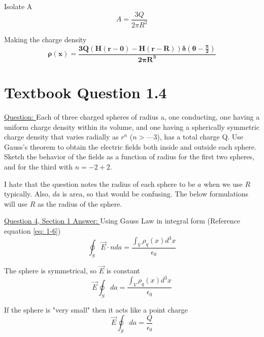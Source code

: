 \documentclass[English]{article}
\begin{document}
    Isolate A
    \begin{equation} \label{eq:3-3}
        A = \frac{3Q}{2 \pi R^3}
    \end{equation}

    Making the charge density 
    \begin{equation} \label{eq:3-4}
        \boxed{\boldsymbol{\rho(x) = \frac{3 Q (H(r-0) - H(r-R)) \delta(\theta - \frac{\pi}{2})}{2 \pi R^3}}}
    \end{equation}

\newpage
\section{Textbook Question 1.4} \label{section4}
    \underline{Question: }
    \newline Each of three charged spheres of radius a, one conducting, one having a uniform charge density within its volume, and one having a spherically symmetric charge density that varies radially as $r^n$ ($n > —3$), has a total charge Q. Use Gauss’s theorem to obtain the electric fields both inside and outside each sphere. Sketch the behavior of the fields as a function of radius for the first two spheres, and for the third with $n = - 2 + 2$.

    I hate that the question notes the radius of each sphere to be $a$ when we use $R$ typically. Also, $da$ is area, so that would be confusing. The below formulations will use $R$ as the radius of the sphere.

    \underline{Question 4, Section 1 Answer: }
    \newline \newline Using Gauss Law in integral form (Reference equation \ref{eq: 1-6})
    \begin{equation}
        \oint_S \vec{E} \cdot n da = \frac{\int_V \rho_q(x) d^3 x}{\epsilon_0}        
    \end{equation}

    The sphere is symmetrical, so $\vec{E}$ is constant
    \begin{equation} \label{eq: 4-1}
        \vec{E} \oint_S da = \frac{\int_V \rho_q(x) d^3 x}{\epsilon_0}         
    \end{equation}

    If the sphere is "very small" then it acts like a point charge
    \begin{equation} \label{eq: 4-2}
        \vec{E} \oint_S da = \frac{Q}{\epsilon_0}         
    \end{equation}
\end{document}
